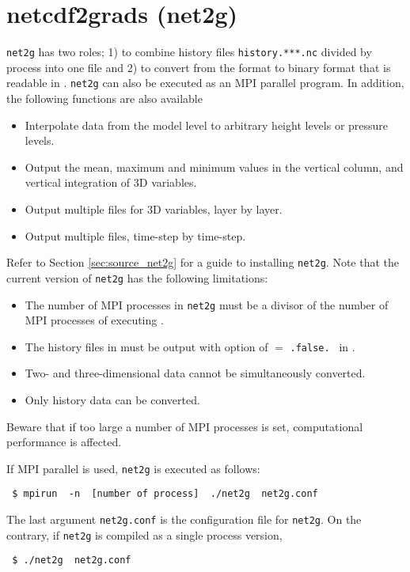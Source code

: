 \section{netcdf2grads (net2g)} \label{sec:net2g}

\verb|net2g| has two roles; 1) to combine history files \verb|history.***.nc| divided by process into one file
and 2) to convert from the \netcdf format to binary format that is readable in \grads.
\verb|net2g| can also be executed as an MPI parallel program.
%
In addition, the following functions are also available
\begin{itemize}
 \item Interpolate data from the model level to arbitrary height levels or pressure levels.
 \item Output the mean, maximum and minimum values in the vertical column,
 and vertical integration of 3D variables.
 \item Output multiple files for 3D variables, layer by layer.
 \item Output multiple files, time-step by time-step.
\end{itemize}


Refer to Section \ref{sec:source_net2g} for a guide to installing \verb|net2g|.
Note that the current version of \verb|net2g| has the following limitations:
\begin{itemize}
 \item The number of MPI processes in \verb|net2g| must be a divisor of the number of MPI processes of executing \scalerm.
 \item The history files in \scalerm must be output with option of  $=$ \verb|.false. | in .
 \item Two- and three-dimensional data cannot be simultaneously converted.
 \item Only history data can be converted.
\end{itemize}
Beware that if too large a number of MPI processes is set,
computational performance is affected.


If MPI parallel is used, \verb|net2g| is executed as follows:
\begin{verbatim}
 $ mpirun  -n  [number of process]  ./net2g  net2g.conf
\end{verbatim}
The last argument \verb|net2g.conf| is the configuration file for \verb|net2g|.
On the contrary, if \verb|net2g| is compiled as a single process version,
\begin{verbatim}
 $ ./net2g  net2g.conf
\end{verbatim}

